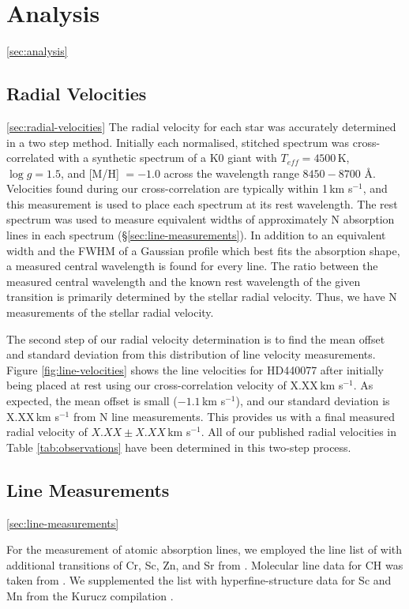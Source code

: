 \documentclass{emulateapj}
\begin{document}
\section{Analysis}
\ref{sec:analysis}

\subsection{Radial Velocities}
\ref{sec:radial-velocities}
The radial velocity for each star was accurately determined in a two step method. Initially each normalised, stitched spectrum was cross-correlated with a synthetic spectrum of a K0 giant with $T_{eff} = 4500$\,K, $\log{g} = 1.5$, and [M/H] $= -1.0$ across the wavelength range $8450 - 8700$ \AA{}. Velocities found during our cross-correlation are typically within 1\,km s$^{-1}$, and this measurement is used to place each spectrum at its rest wavelength. The rest spectrum was used to measure equivalent widths of approximately N absorption lines in each spectrum (\S\ref{sec:line-measurements}). In addition to an equivalent width and the FWHM of a Gaussian profile which best fits the absorption shape, a measured central wavelength is found for every line. The ratio between the measured central wavelength and the known rest wavelength of the given transition is primarily determined by the stellar radial velocity. Thus, we have N measurements of the stellar radial velocity. 

The second step of our radial velocity determination is to find the mean offset and standard deviation from this distribution of line velocity measurements. Figure \ref{fig:line-velocities} shows the line velocities for HD440077 after initially being placed at rest using our cross-correlation velocity of X.XX\,km s$^{-1}$. As expected, the mean offset is small ($-1.1$\,km s$^{-1}$), and our standard deviation is X.XX\,km s$^{-1}$ from N line measurements. This provides us with a final measured radial velocity of $X.XX \pm X.XX$\,km s$^{-1}$. All of our published radial velocities in Table \ref{tab:observations} have been determined in this two-step process. 

\subsection{Line Measurements}
\ref{sec:line-measurements}

For the measurement of atomic absorption lines, we employed the line list of \citet{Yong;et-al_2009} with additional transitions of Cr, Sc, Zn, and Sr from \citet{Frebel;et-al_2009}. Molecular line data for CH was taken from \citet{Plez;et-al_2008,Plez;et-al_2009}. We supplemented the list with hyperfine-structure data for Sc and Mn  from the Kurucz compilation \citet{Kurucz;1998}.
\end{document}
